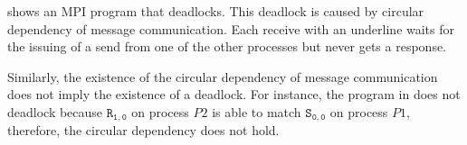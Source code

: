  shows an MPI program that deadlocks. This deadlock is caused by circular dependency of message communication. Each receive with an underline waits for the issuing of a send from one of the other processes but never gets a response.

\examplefigthree

Similarly, the existence of the circular dependency of message communication does not imply the existence of a deadlock. For instance, the program in  does not deadlock because $\mathtt{R_{1,0}}$ on process $P2$ is able to match $\mathtt{S_{0,0}}$ on process $P1$, therefore, the circular dependency does not hold. 

\examplefigfour





